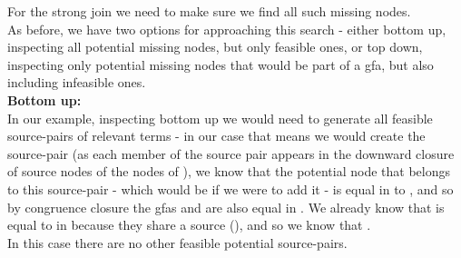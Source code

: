 For the strong join we need to make sure we find all such missing nodes. \\
As before, we have two options for approaching this search - either bottom up, inspecting all potential missing nodes, but only feasible ones, or top down, inspecting only potential missing nodes that would be part of a gfa, but also including infeasible ones.\\
\textbf{Bottom up:}\\
In our example, inspecting bottom up we would need to generate all feasible source-pairs of relevant terms - in our case that means
we would create the source-pair  (as each member of the source pair appears in the downward closure of source nodes of the nodes of ), we know that the potential  node that belongs to this source-pair - which would be  if we were to add it - is equal in  to , and so by congruence closure the gfas 
 and  are also equal in .
We already know that  is equal to  in  because they share a source (), and so we know that .\\
In this case there are no other feasible potential source-pairs.
